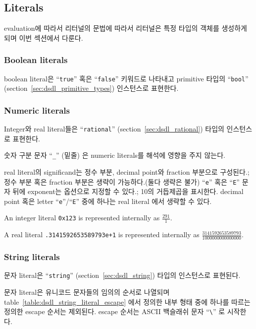 \subsection{Literals}

evaluation에 따라서 리터널의 문법에 따라서 리터널은 특정 타입의 객체를 생성하게 되며 이번 섹션에서 다룬다.

\subsubsection{Boolean literals}

boolean literal은 ``\verb|true|'' 혹은 ``\verb|false|'' 키워드로 나타내고 primitive 타입의 ``\verb|bool|'' (section~\ref{sec:dsdl_primitive_types}) 인스턴스로 표현한다.

\subsubsection{Numeric literals}

Integer와 real literal들은 ``\verb|rational|'' (section~\ref{sec:dsdl_rational}) 타입의 인스턴스로 표현한다.

숫자 구분 문자 ``\verb|_|'' (밑줄) 은 numeric literals를 해석에 영향을 주지 않는다.

real literal의 significand는 정수 부분, decimal point와 fraction 부분으로 구성된다.;
정수 부분 혹은 fraction 부분은 생략이 가능하다.(둘다 생략은 불가)
``\verb|e|'' 혹은 ``\verb|E|'' 문자 뒤에 exponent는 옵션으로 지정할 수 있다.;
10의 거듭제곱을 표시한다.
decimal point 혹은 letter ``\verb|e|''/``\verb|E|'' 중에 하나는 real literal 에서 생략할 수 있다.

\begin{remark}
    An integer literal \verb|0x123| is represented internally as $\frac{291}{1}$.

    A real literal \verb|.3141592653589793e+1| is represented internally as
    $\frac{3141592653589793}{1000000000000000}$.
\end{remark}

\subsubsection{String literals}

문자 literal은 ``\verb|string|'' (section~\ref{sec:dsdl_string}) 타입의 인스턴스로 표현된다.

문자 literal은 유니코드 문자들의 임의의 순서로 나열되며 table~\ref{table:dsdl_string_literal_escape} 에서 정의한 내부 형태 중에 하나를 따르는 정의한 escape 순서는 제외된다.
escape 순서는 ASCII 백슬래쉬 문자 ``\verb|\|'' 로 시작한다.

